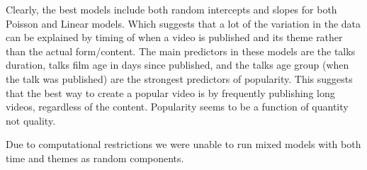 
Clearly, the best models include both random intercepts and slopes for both Poisson and Linear models. Which suggests that a lot of the variation in the data can be explained by timing of when a video is published and its theme rather than the actual form/content. The main predictors in these models are the talks duration, talks film age in days since published, and the talks age group (when the talk was published) are the strongest predictors of popularity. This suggests that the best way to create a popular video is by frequently publishing long videos, regardless of the content. Popularity seems to be a function of quantity not quality.


Due to computational restrictions we were unable to run mixed models with both time and themes as random components.













